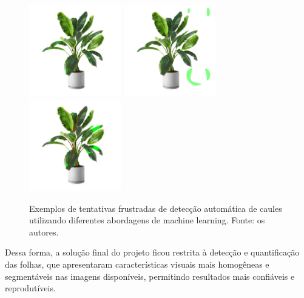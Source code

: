 \begin{figure}[H]
    \centering
    \includegraphics[height=4cm]{../figures/ml_results/attempt1.png}
    \hspace{0.2cm}
    \includegraphics[height=4cm]{../figures/ml_results/attempt2.png}
    \hspace{0.2cm}
    \includegraphics[height=4cm]{../figures/ml_results/attempt3.jpg}
    \caption{Exemplos de tentativas frustradas de detecção automática de caules utilizando diferentes abordagens de machine learning. Fonte: os autores.}
    \label{fig:ml_failed_attempts}
\end{figure}

Dessa forma, a solução final do projeto ficou restrita à detecção e quantificação das folhas, que apresentaram características visuais mais homogêneas e segmentáveis nas imagens disponíveis, permitindo resultados mais confiáveis e reprodutíveis.
